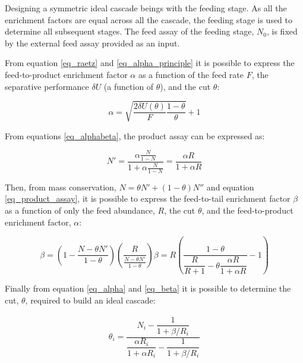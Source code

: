 Designing a symmetric ideal cascade beings with the feeding
stage. As all the enrichment factors are equal across all the cascade, the
feeding stage is used to determine all subsequent stages.
The feed assay of the feeding stage, $N_{0}$, is fixed by the external feed assay
provided as an input.

From equation \eqref{eq_raetz} and \eqref{eq_alpha_principle} it is possible to
express the feed-to-product enrichment factor $\alpha$ as a function of the feed rate $F$, the separative performance
$\delta U$ (a function of $\theta$), and the cut $\theta$:

\begin{equation} \label{eq_alpha}
    \alpha = \sqrt{\frac{2\delta U(\theta)}{F} \frac{1-\theta}{\theta}} + 1
\end{equation}


From equations \eqref{eq_alphabeta}, the product assay can be expressed as:

\begin{equation}\label{eq_product_assay}
    N' = \frac{\alpha \frac{N}{1-N}}{1+\alpha \frac{N}{1-N}} = \frac{\alpha R}{1 + \alpha R}
\end {equation}


Then, from mass conservation, $N = \theta N' + (1-\theta)N''$ and equation
\eqref{eq_product_assay}, it is possible to express the feed-to-tail enrichment factor $\beta$ as a function of only the feed abundance, $R$, the cut $\theta$, and the feed-to-product enrichment factor, $\alpha$:

\begin{subequations}
    \begin{equation}\label{eq_beta_interim}
        \beta = \left( 1 - \frac{N - \theta N'}{1-\theta} \right)
                        \left( \frac{R}{\frac{N - \theta N'}{1 - \theta}} \right)
    \end{equation}
    \begin{equation}\label{eq_beta}
        \beta =   R \left(\dfrac{1-\theta}
                        {\dfrac{R}{R+1}- \theta \dfrac{\alpha R}{1+\alpha R}} -1\right)
    \end{equation}
\end{subequations}

Finally from equation \eqref{eq_alpha} and \eqref{eq_beta} it is possible to
determine the cut, $\theta$, required to build an ideal cascade:

\begin{eqnarray}
    \theta_{i} = \dfrac{N_{i} - \dfrac{1}{1 + \beta/R_{i}}}{ \dfrac{\alpha R_{i}}{1 + \alpha R_{i}} -
           \dfrac{1}{1 + \beta/R_{i}}}
           \label{eq_theta}
\end{eqnarray}


